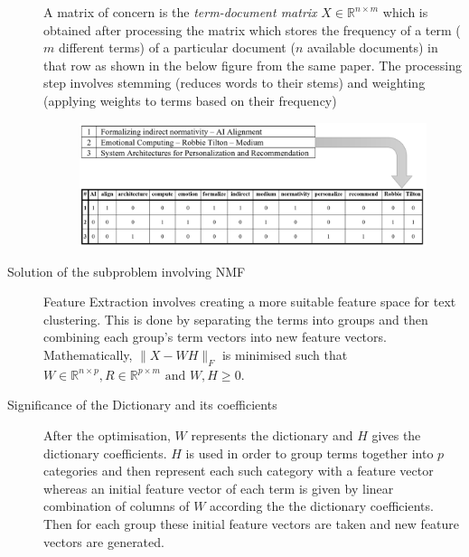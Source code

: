 \documentclass[a4paper]{article}
\begin{document}
\begin{description}
	A matrix of concern is the \emph{term-document matrix} $X \in \mathbb{R}^{n\times m}$ which is obtained after processing the matrix which stores the frequency of a term ($m$ different terms) of a particular document ($n$ available documents) in that row as shown in the below figure from the same paper. The processing step involves stemming (reduces words to their stems) and weighting (applying weights to terms based on their frequency)
	\begin{figure}[H]
	\centering
	\includegraphics[width=\linewidth]{../media/Q3 count matrix.png}
	\end{figure}
	\item[Solution of the subproblem involving NMF] Feature Extraction involves creating a more suitable feature space for text clustering. This is done by separating the terms into groups and then combining each group's term vectors into new feature vectors.
	Mathematically, $\|X-WH\|_F$ is minimised such that $W\in\mathbb{R}^{n\times p}, R\in\mathbb{R}^{p\times m}\text{ and }W,H \geq 0$.
	\item[Significance of the Dictionary and its coefficients] 
	After the optimisation, $W$ represents the dictionary and $H$ gives the dictionary coefficients. $H$ is used in order to group terms together into $p$ categories and then represent each such category with a feature vector whereas an initial feature vector of each term is given by linear combination of columns of $W$ according the the dictionary coefficients. Then for each group these initial feature vectors are taken and new feature vectors are generated.
\end{description}
\end{document}
